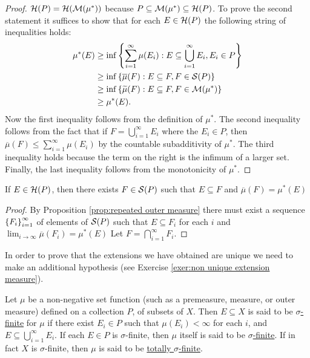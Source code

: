 \begin{proof}

${\cal H}(P)={\cal H}({\cal M}(\mu^*))$ because $P \subseteq {\cal M}(\mu^*) \subseteq {\cal H}(P)$. To prove the second statement it suffices to show that for each $E \in {\cal H}(P)$ the following string of inequalities holds:
\begin{align*}
    \mu^*(E) &\geq \inf\left\{\sum_{i=1}^\infty\mu(E_i):E\subseteq \bigcup_{i=1}^\infty E_i, E_i \in P\right\}\\
    &\geq \inf \left\{\overline{\mu}(F):E\subseteq F,F\in {\cal S}(P)\right\}\\
    &\geq \inf \left\{\widetilde{\mu}(F):E\subseteq F,F\in {\cal M}(\mu^*)\right\}\\
    &\geq \mu^*(E).
\end{align*}
Now the first inequality follows from the definition of $\mu^*$. The second inequality follows from the fact that if $F=\bigcup_{i=1}^\infty E_i$ where the $E_i \in P$, then $\overline{\mu}(F) \leq \sum_{i=1}^\infty \mu(E_i)$ by the countable subadditivity of $\mu^*$. The third inequality holds because the term on the right is the infimum of a larger set. Finally, the last inequality follows from the monotonicity of $\mu^*$.
\end{proof}

\begin{corollary}
\label{cor:measure of hereditary wrt outer measure}
If $E \in {\cal H}(P)$, then there exists $F \in {\cal S}(P)$ such that $E \subseteq F$ and $\overline{\mu}(F)=\mu^*(E)$
\end{corollary}
\begin{proof}
By Proposition \ref{prop:repeated outer measure} there must exist a sequence $\left\{F_i\right\}_{i=1}^\infty$ of elements of ${\cal S}(P)$ such that $E \subseteq F_i$ for each $i$ and $\lim _{i \to \infty} \overline{\mu}(F_i)=\mu^*(E)$ Let $F=\bigcap_{i=1}^\infty F_i$.
\end{proof}

In order to prove that the extensions we have obtained are unique we need to make an additional hypothesis (see Exercise \ref{exer:non unique extension measure}).

\begin{definition}
Let $\mu$ be a non-negative set function (such as a premeasure, measure, or outer measure) defined on a collection $P$, of subsets of $X$. Then $E \subseteq X$ is said to be \underline{$\sigma$-finite} for $\mu$ if there exist $E_i \in P$ such that $\mu(E_i)<\infty$ for each $i$, and $E \subseteq \bigcup_{i=1}^\infty E_i$. If each $E \in P$ is $\sigma$-finite, then $\mu$ itself is said to be \underline{$\sigma$-finite}. If in fact $X$ is $\sigma$-finite, then $\mu$ is said to be \underline{totally $\sigma$-finite}.
\end{definition}

